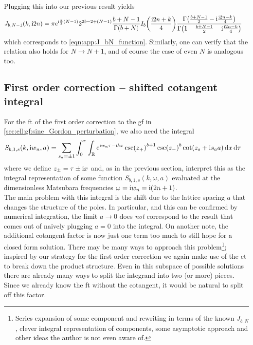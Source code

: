 Plugging this into our previous result yields
\begin{align*}
J_{b,N-1}(k,\i 2n) &= \pi \powe{\i \frac{\pi}{2}(N-1)} 2^{2b-2+(N-1)} \frac{b+N-1}{\Gamma(b+N)} I_b\kla*{\frac{\i 2n + k}{4}} \frac{\Gamma\kla*{\frac{b+N-1}{2} - \i \frac{\i 2n - k}{4}} }{\Gamma\kla*{1-\frac{b+N-1}{2} - \i \frac{\i 2n - k}{4}}}
\end{align*}
which corresponds to \autoref{eqn:app:J_bN_function}.
Similarly, one can verify that the relation also holds for $N\rightarrow N+1$, and of course the case of even $N$ is analogous too.
\subsection{First order correction -- shifted cotangent integral}\label{sec:app:first_order_correction_shifted_cot}
For the \gls{ft} of the first order correction to the \gls{gf} in \autoref{sec:ell:gf:sine_Gordon_perturbation}, we also need the integral
\begin{align}
S_{b,1,s}(k,\text{i} w_n, a) &= \sum_{s_a=\pm 1} \int_{0}^{\pi} \int_{\mathbb{R}} \text{e}^{\text{i} w_n\tau - \text{i} kx} \csc(z_+)^{b+1} \csc(z_-)^b \cot(z_s + \text{i} s_aa) \, \mathrm{d}x  \,\mathrm{d}\tau \label{eqn:app:S_b1s_function_def}
\end{align}
where we define $z_\pm = \tau \pm\text{i} x$ and, as in the previous section, interpret this as the integral representation of some function $S_{b,1,s}(k,\omega,a)$ evaluated at the dimensionless Matsubara frequencies $\omega = \text{i} w_n = \text{i}(2n+1)$.\\
The main problem with this integral is the shift due to the lattice spacing $a$ that changes the structure of the poles.
In particular, and this can be confirmed by numerical integration, the limit $a\rightarrow 0$ does \emph{not} correspond to the result that comes out of naively plugging $a=0$ into the integral.
On another note, the additional cotangent factor is now just one term too much to still hope for a closed form solution.
There may be many ways to approach this problem\footnote{Series expansion of some component and rewriting in terms of the known $J_{b,N}$, clever integral representation of components, some asymptotic approach and other ideas the author is not even aware of.}; inspired by our strategy for the first order correction we again make use of the \gls{ct} to break down the product structure.
Even in this subspace of possible solutions there are already many ways to split the integrand into two (or more) pieces.
Since we already know the \gls{ft} without the cotangent, it would be natural to split off this factor.
